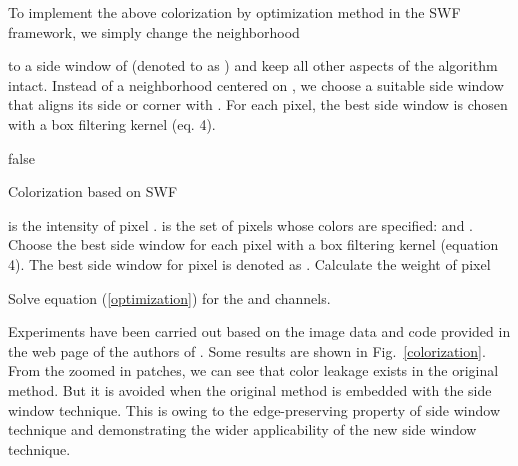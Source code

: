 \documentclass[10pt,twocolumn,letterpaper]{article}
\begin{document}
To implement the above colorization by optimization method in the SWF framework, we simply change the neighborhood { to a side window of  (denoted to as ) and keep all other aspects of the algorithm intact. Instead of a neighborhood centered on , we choose a suitable side window  that aligns its side or corner with . For each pixel, the best side window is chosen with a box filtering kernel (eq. 4). 

\if false
	\begin{algorithm}[!htbp]
		\caption{Colorization based on SWF} \label{algo_color}
		\begin{algorithmic}[1]
			\REQUIRE  is the intensity of pixel .  is the set of pixels whose colors are specified:  and .
			\STATE Choose the best side window for each pixel with a box filtering kernel (equation 4). The best side window for pixel  is denoted as .
			\STATE Calculate the weight of pixel  
			
			
\STATE Solve equation (\ref{optimization}) for the  and  channels.
\end{algorithmic}
	\end{algorithm}
	\fi
	Experiments have been carried out based on the image data and code provided in the web page of the authors of \cite{colorization}. Some results are shown in Fig.~\ref{colorization}. From the zoomed in patches, we can see that color leakage exists in the original method. But it is avoided when the original method is embedded with the side window technique. This is owing to the edge-preserving property of side window technique and demonstrating the wider applicability of the new side window technique. 
	
}
\end{document}
